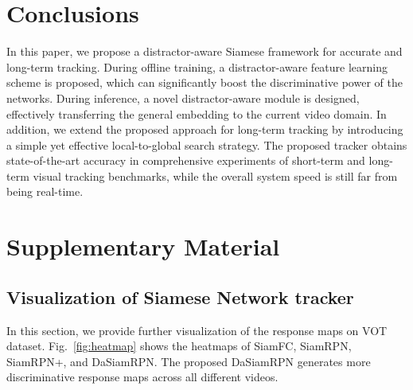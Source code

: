 \documentclass[runningheads]{llncs}
\begin{document}
\section{Conclusions}


In this paper, we propose a distractor-aware Siamese framework for accurate and long-term tracking.
During offline training, a distractor-aware feature learning scheme is proposed, which can significantly boost the discriminative power of the networks.
During inference, a novel distractor-aware module is designed, effectively transferring the general embedding to the current video domain.
In addition, we extend the proposed approach for long-term tracking by introducing a simple yet effective local-to-global search strategy.
The proposed tracker obtains state-of-the-art accuracy in comprehensive experiments of short-term and long-term visual tracking benchmarks, while the overall system speed is still far from being real-time.




\clearpage


\section{Supplementary Material}

\subsection{Visualization of Siamese Network tracker}

In this section, we provide further visualization of the response maps on VOT dataset. Fig.~\ref{fig:heatmap} shows the heatmaps of SiamFC, SiamRPN, SiamRPN+, and DaSiamRPN. The proposed DaSiamRPN generates more discriminative response maps across all different videos.

\begin{figure*}[htbp]
\centering
{}
\hfil
{}
\hfil
{}
\caption{Comparisons with general Siamese network trackers. From left to right: original images; response maps from SiamFC; SiamRPN; SiamRPN+(our method); and DaSiamRPN(our method).}
\label{fig:heatmap}
\end{figure*}
\end{document}
